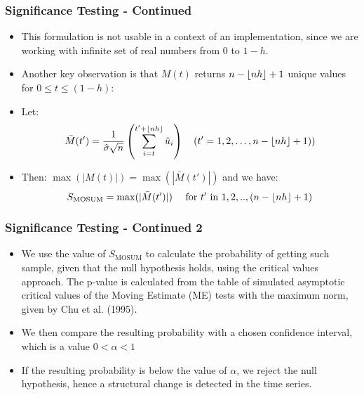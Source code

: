 \documentclass[presentation.tex]{subfiles}
\begin{document}
\begin{frame}
  \frametitle{Significance Testing - Continued}
  \begin{itemize}
  \item This formulation is not usable in a context of an implementation, since we are working
    with infinite set of real numbers from $0$ to $1-h$.
  \item Another key observation is that $M(t)$ returns $n - \lfloor nh\rfloor + 1$ unique values for $0 \leq t \leq (1-h)$:
  \item Let:
    \begin{equation} \label{eq:mosum}
      \bar{M}(t') =
      \frac{1}{\hat{\sigma} \sqrt{n}}
      \left(\sum_{i=t}^{t' + \lfloor nh\rfloor} \hat{u}_i\right)
      \quad(t' = 1,2, \hdots, n - \lfloor nh\rfloor + 1))
    \end{equation}
  \item Then: 
    $\max(|M(t)|) = \max(|\bar{M}(t')|)$ and we have:
    \begin{equation} \label{eq:test_statistic}
      S_{\text{MOSUM}} = \max(|\bar{M}(t')|) \quad \text{ for } t' \text{ in } 1,2,..,(n - \lfloor nh\rfloor + 1)
    \end{equation}
  \end{itemize}
\end{frame}

\begin{frame}
  \frametitle{Significance Testing - Continued 2}
  \begin{itemize}
  \item We use the value of $S_{\text{MOSUM}}$ to calculate the probability of getting such
    sample, given that the null hypothesis holds, using the critical values approach.
    The p-value is calculated from the table of
    simulated asymptotic critical values of the Moving Estimate (ME) tests with
    the maximum norm, given by Chu et al. (1995).
  \item  We then compare the resulting
    probability with a chosen confidence interval, which is a value $0 < \alpha < 1$
    \item If the resulting probability is below the
      value of $\alpha$, we reject the null hypothesis, hence a 
      structural change is detected in the time series. 
  \end{itemize}
\end{frame}
\end{document}
